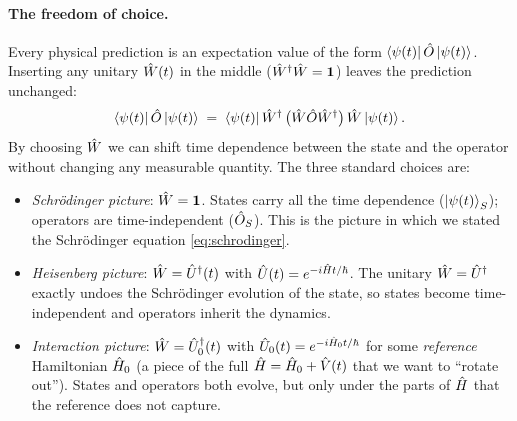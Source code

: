 \paragraph{The freedom of choice.}
Every physical prediction is an expectation value of the form
$\bra{\psi(t)}\hat{O}\ket{\psi(t)}$. Inserting any unitary
$\hat{W}(t)$ in the middle ($\hat{W}^\dagger\hat{W}=\mathbf{1}$) leaves the
prediction unchanged:
\begin{equation}
\bra{\psi(t)}\hat{O}\ket{\psi(t)}
\;=\; \bra{\psi(t)}\hat{W}^\dagger\,\bigl(\hat{W}\hat{O}\hat{W}^\dagger\bigr)\,\hat{W}\ket{\psi(t)}.
\end{equation}
By choosing $\hat{W}$ we can shift time dependence between the state
and the operator without changing any measurable quantity. The
three standard choices are:
\begin{itemize}
  \item \emph{Schr\"odinger picture}: $\hat{W}=\mathbf{1}$. States carry
        all the time dependence ($\ket{\psi(t)}_S$); operators are
        time-independent ($\hat{O}_S$). This is the picture in
        which we stated the Schr\"odinger equation
        \cref{eq:schrodinger}.
  \item \emph{Heisenberg picture}: $\hat{W}=\hat{U}^\dagger(t)$ with
        $\hat{U}(t)=e^{-i\hat{H}t/\hbar}$. The unitary
        $\hat{W}=\hat{U}^\dagger$ exactly undoes the Schr\"odinger
        evolution of the state, so states become time-independent
        and operators inherit the dynamics.
  \item \emph{Interaction picture}: $\hat{W}=\hat{U}_0^\dagger(t)$
        with $\hat{U}_0(t)=e^{-i\hat{H}_0 t/\hbar}$ for some
        \emph{reference} Hamiltonian $\hat{H}_0$ (a piece of the
        full $\hat{H}=\hat{H}_0+\hat{V}(t)$ that we want to ``rotate
        out''). States and operators both evolve, but only under
        the parts of $\hat{H}$ that the reference does not capture.
\end{itemize}

